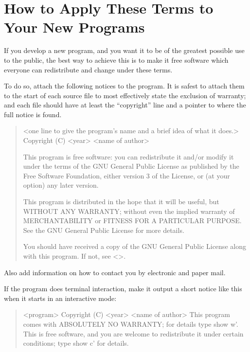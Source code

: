 \documentclass[letterpaper,10pt,english]{sphinxmanual}
\begin{document}
\section{How to Apply These Terms to Your New Programs}
\label{\detokenize{license:how-to-apply-these-terms-to-your-new-programs}}
\sphinxAtStartPar
If you develop a new program, and you want it to be of the greatest
possible use to the public, the best way to achieve this is to make it
free software which everyone can redistribute and change under these terms.

\sphinxAtStartPar
To do so, attach the following notices to the program.  It is safest
to attach them to the start of each source file to most effectively
state the exclusion of warranty; and each file should have at least
the “copyright” line and a pointer to where the full notice is found.
\begin{quote}

\sphinxAtStartPar
\textless{}one line to give the program’s name and a brief idea of what it does.\textgreater{}
Copyright (C) \textless{}year\textgreater{}  \textless{}name of author\textgreater{}

\sphinxAtStartPar
This program is free software: you can redistribute it and/or modify
it under the terms of the GNU General Public License as published by
the Free Software Foundation, either version 3 of the License, or
(at your option) any later version.

\sphinxAtStartPar
This program is distributed in the hope that it will be useful,
but WITHOUT ANY WARRANTY; without even the implied warranty of
MERCHANTABILITY or FITNESS FOR A PARTICULAR PURPOSE.  See the
GNU General Public License for more details.

\sphinxAtStartPar
You should have received a copy of the GNU General Public License
along with this program.  If not, see \textless{}\textgreater{}.
\end{quote}

\sphinxAtStartPar
Also add information on how to contact you by electronic and paper mail.

\sphinxAtStartPar
If the program does terminal interaction, make it output a short
notice like this when it starts in an interactive mode:
\begin{quote}

\sphinxAtStartPar
\textless{}program\textgreater{}  Copyright (C) \textless{}year\textgreater{}  \textless{}name of author\textgreater{}
This program comes with ABSOLUTELY NO WARRANTY; for details type {\color{red}\bfseries{}\textasciigrave{}}show w’.
This is free software, and you are welcome to redistribute it
under certain conditions; type {\color{red}\bfseries{}\textasciigrave{}}show c’ for details.
\end{quote}
\end{document}
